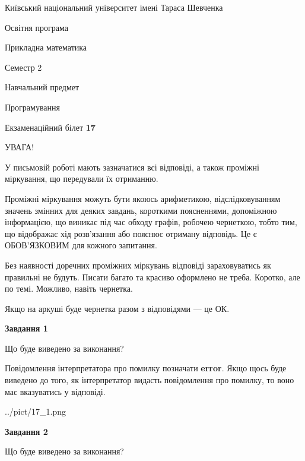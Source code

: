 \documentclass[12pt, ukrainian]{article}
\begin{document}
{{\begin {small}\par
{ \center  Київський національний університет імені Тараса Шевченка \par}
{\parbox {5 cm}{Освітня програма \hfill}{\parbox {7 cm}{Прикладна математика \hfill}}\parbox {6 cm}{\hfill Семестр 2}}\par
{\parbox {5 cm} {Навчальний предмет \hfill}\parbox {7 cm}{Програмування \hfill}\parbox {6cm}{\hfill}\par}\vspace{-7pt} \end{small}}{\center Екзаменаційний білет \No \textbf
{ 17 }\par}}
{
\begin {large}
УВАГА!

У письмовій роботі мають зазначатися всі відповіді, а також проміжні міркування, що передували їх отриманню.

Проміжні міркування можуть бути якоюсь арифметикою, відслідковуванням зна\-чень змінних для деяких завдань,
короткими поясненнями, допоміжною інформацією, що виникає під час обходу графів, робочею чернеткою,
тобто тим, що відображає хід розв’язання або пояснює отриману відповідь.
Це є ОБОВ’ЯЗКОВИМ для кожного запитання.

Без наявності доречних проміжних міркувань відповіді зараховуватись як правиль\-ні не будуть.
Писати багато та красиво оформлено не треба. Коротко, але по темі. Можли\-во, навіть чернетка.

Якщо на аркуші буде чернетка разом з відповідями --- це ОК.

\newpage

{\begin {center}\textbf{Завдання 1}\end {center}}\par
Що буде виведено за виконання?

Повідомлення інтерпретатора про помилку позначати \textbf{error}.
Якщо щось буде виведено до того, як інтерпретатор видасть повідомлення про помилку, 
то воно має вказуватись у відповіді. \par


\begin{center}
	{../pict/17_1.png}
\end{center}
\newpage

{\begin {center}\textbf{Завдання 2}\end {center}}\par
Що буде виведено за виконання?


\end{large}}
\end{document}
